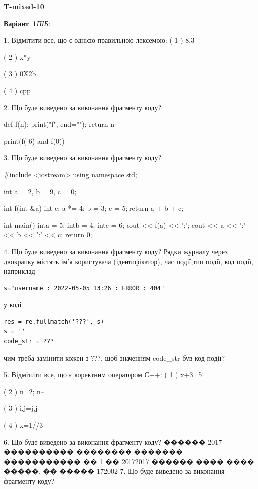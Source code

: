 \documentclass[11pt]{article}
\begin{document}
{\large\textbf{T-mixed-10}}

\textbf{Варіант \No\,1}\hfill \textit{ПІБ:}\,\underline{\hspace{60mm}}
\vspace{4mm}

1. Відмітити все, що є однією правильною лексемою:
( 1 ) 8,3

( 2 ) x*y

( 3 ) 0X2b

( 4 ) cpp

2. Що буде виведено за виконання фрагменту коду?

def f(n):
    print("f", end="");
    return n

print(f(-6) and f(0))

3. Що буде виведено за виконання фрагменту коду?

#include <iostream>
using namespace std;

int a = 2, b = 9, c = 0;

int f(int &a){
int c;    a *= 4;
    b = 3;
    c = 5;
    return a + b + c;
}

int main(){
    inta = 5;
    intb = 4;
    intc = 6;
    cout << f(a) << ':';
    cout << a << ':' << b << ':' << c;
    return 0; 
}

4. Що буде виведено за виконання фрагменту коду?
Рядки журналу через двокрапку містять ім'я користувача (ідентифікатор), час події,тип події, код події, наприклад
\begin{verbatim}
s="username : 2022-05-05 13:26 : ERROR : 404"
\end{verbatim}
у коді 
\begin{verbatim}
res = re.fullmatch('???', s) 
s = ''
code_str = ??? 
\end{verbatim}
чим треба замінити кожен з ???, щоб значенням code\_str був код події? 



5. Відмітити все, що є коректним оператором С++:
( 1 ) x+3=5

( 2 ) n=2; n--

( 3 ) i,j=j,j

( 4 ) x=1//3

6. Що буде виведено за виконання фрагменту коду?
������ 2017-���������� �������� ������� ����������� �� 1 �� 20172017 ������ ���� ���� �����, �� ����� 172002
7. Що буде виведено за виконання фрагменту коду?
\end{document}
